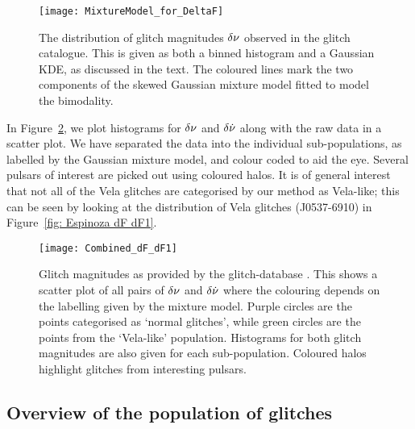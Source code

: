 \documentclass[../full_thesis/full_thesis.tex]{subfiles}
\begin{document}
\begin{figure}[htb]
\centering
\texttt{[image: MixtureModel\_for\_DeltaF]}
\caption{The distribution of glitch magnitudes $\delta\nu$ observed in the
glitch catalogue. This is given as both a binned histogram and a Gaussian
KDE, as discussed in the text. The coloured lines mark the two components of
the skewed Gaussian mixture model fitted to model the bimodality.}
\label{fig: Delta nu mixture}
\end{figure}

In Figure~\ref{fig: Espinoza dF dF1}, we plot histograms for $\delta\nu$ and
$\delta\dot{\nu}$ along with the raw data in a scatter plot. We have separated
the data into the individual sub-populations, as labelled by the Gaussian
mixture model, and colour coded to aid the eye. Several pulsars of interest are
picked out using coloured halos. It is of general interest that not all of the
Vela glitches are categorised by our method as Vela-like; this can be seen by
looking at the distribution of Vela glitches (J0537-6910) in Figure~\ref{fig:
Espinoza dF dF1}.
\begin{figure*}[htb]
\centering
\texttt{[image: Combined\_dF\_dF1]}
\caption{Glitch magnitudes as provided by the glitch-database
         \citep{Espinoza2011}. This shows a scatter plot of all pairs of
         $\delta\nu$ and $\delta\dot{\nu}$ where the colouring depends on the
         labelling given by the mixture model. Purple circles are the
         points categorised as `normal glitches', while green
         circles are the points from the `Vela-like' population. Histograms for
         both glitch magnitudes are also given for each sub-population.
         Coloured halos highlight glitches from interesting pulsars.}
\label{fig: Espinoza dF dF1}
\end{figure*}


\subsection{Overview of the population of glitches}
\label{sec: overview of the population of glitches}
\end{document}

